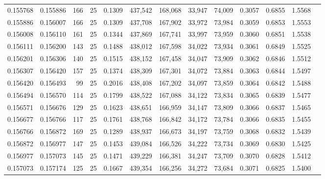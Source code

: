 \begin{tabular}{rrrrrrrrrrrrr}
0.155768 & 0.155886 &   166 &  25 &                                     0.1309 & 437,542 & 168,068 &  33,947 &  74,009 & 0.3057 & 0.6855 & 1.5568 \\
0.155886 & 0.156007 &   166 &  25 &                                     0.1309 & 437,708 & 167,902 &  33,972 &  73,984 & 0.3059 & 0.6853 & 1.5553 \\
0.156008 & 0.156110 &   161 &  25 &                                     0.1344 & 437,869 & 167,741 &  33,997 &  73,959 & 0.3060 & 0.6851 & 1.5538 \\
0.156111 & 0.156200 &   143 &  25 &                                     0.1488 & 438,012 & 167,598 &  34,022 &  73,934 & 0.3061 & 0.6849 & 1.5525 \\
0.156201 & 0.156306 &   140 &  25 &                                     0.1515 & 438,152 & 167,458 &  34,047 &  73,909 & 0.3062 & 0.6846 & 1.5512 \\
0.156307 & 0.156420 &   157 &  25 &                                     0.1374 & 438,309 & 167,301 &  34,072 &  73,884 & 0.3063 & 0.6844 & 1.5497 \\
0.156420 & 0.156493 &    99 &  25 &                                     0.2016 & 438,408 & 167,202 &  34,097 &  73,859 & 0.3064 & 0.6842 & 1.5488 \\
0.156494 & 0.156570 &   114 &  25 &                                     0.1799 & 438,522 & 167,088 &  34,122 &  73,834 & 0.3065 & 0.6839 & 1.5477 \\
0.156571 & 0.156676 &   129 &  25 &                                     0.1623 & 438,651 & 166,959 &  34,147 &  73,809 & 0.3066 & 0.6837 & 1.5465 \\
0.156677 & 0.156766 &   117 &  25 &                                     0.1761 & 438,768 & 166,842 &  34,172 &  73,784 & 0.3066 & 0.6835 & 1.5455 \\
0.156766 & 0.156872 &   169 &  25 &                                     0.1289 & 438,937 & 166,673 &  34,197 &  73,759 & 0.3068 & 0.6832 & 1.5439 \\
0.156872 & 0.156977 &   147 &  25 &                                     0.1453 & 439,084 & 166,526 &  34,222 &  73,734 & 0.3069 & 0.6830 & 1.5425 \\
0.156977 & 0.157073 &   145 &  25 &                                     0.1471 & 439,229 & 166,381 &  34,247 &  73,709 & 0.3070 & 0.6828 & 1.5412 \\
0.157073 & 0.157174 &   125 &  25 &                                     0.1667 & 439,354 & 166,256 &  34,272 &  73,684 & 0.3071 & 0.6825 & 1.5400 \\

\end{tabular}
